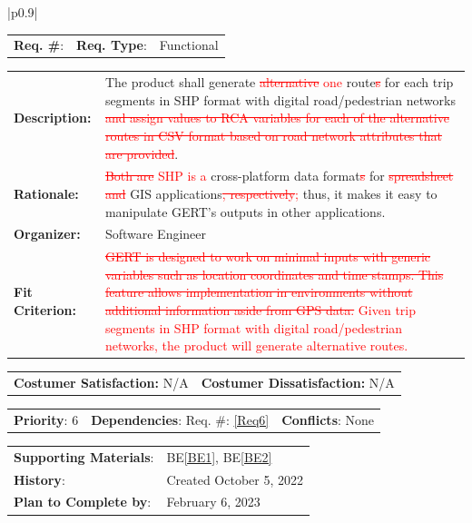 \documentclass[12pt, titlepage]{article}
\newcommand{\beref}[1]{BE\ref{#1}}
\newcounter{reqnum}
\newcommand{\reqthereqnum}{\textbf{Req. \#}: \thereqnum}
\newcommand{\reqref}[1]{Req. \#: \ref{#1}}
\newenvironment{boxed}
    {\begin{center}
    \begin{tabular}{|p{0.9\textwidth}|}
    \hline\\
    }
    { 
    \\\\\hline
    \end{tabular} 
    \end{center}
    }
\begin{document}
\begin{boxed}
\begin{tabular}{l r r}
{reqnum} \reqthereqnum \label{Req8} & {\bf Req. Type}: &  Functional\\
\end{tabular}
\newline
\begin{tabular}{l p{11.5cm}}
    {\bf Description:} & The product shall generate \textcolor{red}{\sout{alternative} one} route\textcolor{red}{\sout{s}} for each trip segments in SHP format with digital road/pedestrian networks \textcolor{red}{\sout{and assign values to RCA variables for each of the alternative routes in CSV format based on road network attributes that are provided}}.  \\
    {\bf Rationale:} & \textcolor{red}{\sout{Both are} SHP is a} cross-platform data format\textcolor{red}{\sout{s}} for \textcolor{red}{\sout{spreadsheet and}} GIS applications\textcolor{red}{\sout{, respectively};} thus, it makes it easy to manipulate GERT’s outputs in other applications. \\
    {\bf Organizer:} & Software Engineer\\
    {\bf Fit Criterion:} &  \textcolor{red}{\sout{GERT is designed to work on minimal inputs with generic variables such as location coordinates and time stamps. This feature allows implementation in environments without additional information aside from GPS data.} Given trip segments in SHP format with digital road/pedestrian networks, the product will generate alternative routes.}\\
\end{tabular}
\begin{tabular}{l r}
{\bf Costumer Satisfaction:} N/A &  {\bf Costumer Dissatisfaction:}  N/A\\
\end{tabular}
\begin{tabular}{l r r}
    {\bf Priority}: 6 & {\bf Dependencies}:  \reqref{Req6} & {\bf Conflicts}: None \\
\end{tabular}
\begin{tabular}{l l}
     {\bf Supporting Materials}:& 
     \beref{BE1}, \beref{BE2} \\ 
     {\bf History}: & Created October 5, 2022\\
     {\bf Plan to Complete by}: & February 6, 2023\\
\end{tabular}
\end{boxed}
\end{document}
